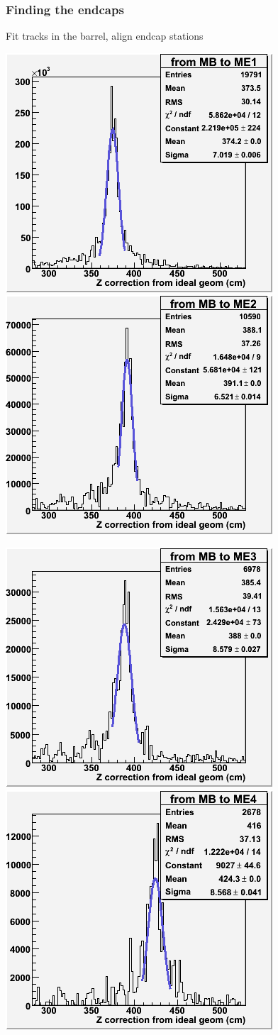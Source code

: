 \documentclass[compress]{beamer}
\begin{document}
\begin{frame}
\frametitle{Finding the endcaps}

Fit tracks in the barrel, align endcap stations

\includegraphics[width=0.4\linewidth]{hist_0and1.png}
\includegraphics[width=0.4\linewidth]{hist_0and2.png}

\includegraphics[width=0.4\linewidth]{hist_0and3.png}
\includegraphics[width=0.4\linewidth]{hist_0and4.png}

\end{frame}
\end{document}
